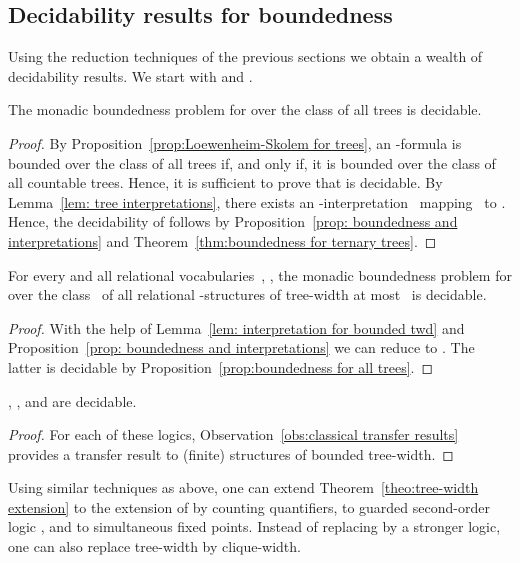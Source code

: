 \documentclass{LMCS}
\begin{document}
\begin{thm}
\section{Decidability results for boundedness}
\label{sect:decidabilities}
\label{sect:end II}

Using the reduction techniques of the previous sections
we obtain a wealth of decidability results.
We start with  and .
\begin{prop}\label{prop:boundedness for all trees}
The monadic boundedness problem for  over the class of all trees is decidable.
\end{prop}
\begin{proof}
By Proposition~\ref{prop:Loewenheim-Skolem for trees}, an -formula
is bounded over the class of all trees if, and only if, it is bounded over
the class of all countable trees. Hence, it is sufficient to prove that
 is decidable.
By Lemma~\ref{lem: tree interpretations},
there exists an -interpretation~ mapping~
to . Hence, the decidability of 
follows by Proposition~\ref{prop: boundedness and interpretations}
and Theorem~\ref{thm:boundedness for ternary trees}.
\end{proof}
\begin{thm}\label{theo:tree-width extension}
For every  and all relational vocabularies~,
, the monadic boundedness problem for 
over the class~ of all relational -structures
of tree-width at most~ is decidable.
\end{thm}
\begin{proof}
With the help of
Lemma~\ref{lem: interpretation for bounded twd}
and Proposition~\ref{prop: boundedness and interpretations}
we can reduce  to .
The latter is decidable by
Proposition~\ref{prop:boundedness for all trees}.
\end{proof}

\begin{cor}
, , and\/  are decidable.
\end{cor}
\begin{proof}
For each of these logics,
Observation~\ref{obs:classical transfer results}
provides a transfer result
to (finite) structures of bounded tree-width.
\end{proof}

Using similar techniques as above, one can extend Theorem~\ref{theo:tree-width extension}
to the extension of  by counting quantifiers,
to guarded second-order logic , and to simultaneous fixed points.
Instead of replacing  by a stronger logic,
one can also replace tree-width by clique-width.


\end{thm}
\end{document}
